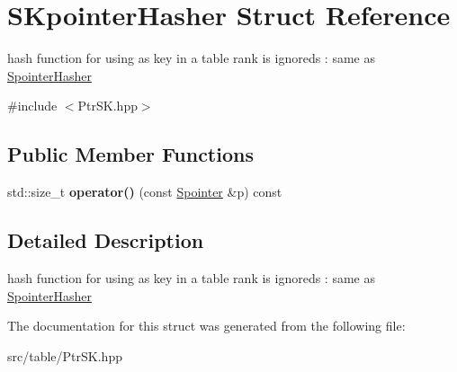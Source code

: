 \hypertarget{structSKpointerHasher}{}\section{S\+Kpointer\+Hasher Struct Reference}
\label{structSKpointerHasher}


hash function for using as key in a table rank is ignoreds \+: same as \mbox{\hyperlink{structSpointerHasher}{Spointer\+Hasher}}  




{\ttfamily \#include $<$Ptr\+S\+K.\+hpp$>$}

\subsection*{Public Member Functions}
\begin{DoxyCompactItemize}
\item 
\mbox{\label{structSKpointerHasher_a7fc8a127e77422b38e9ec5bab09718ef}} 
std\+::size\+\_\+t {\bfseries operator()} (const \mbox{\hyperlink{classSpointer}{Spointer}} \&p) const
\end{DoxyCompactItemize}


\subsection{Detailed Description}
hash function for using as key in a table rank is ignoreds \+: same as \mbox{\hyperlink{structSpointerHasher}{Spointer\+Hasher}} 

The documentation for this struct was generated from the following file\+:\begin{DoxyCompactItemize}
\item 
src/table/Ptr\+S\+K.\+hpp\end{DoxyCompactItemize}

